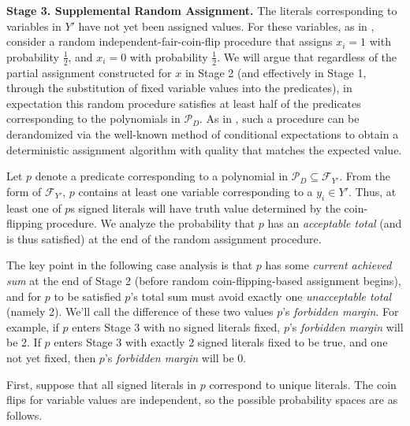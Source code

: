 \documentclass{article}
\begin{document}
\noindent \textbf{Stage 3. Supplemental Random Assignment.} The literals corresponding to variables in $Y'$ have not yet been assigned values. For these variables, as in \citep{RS}, consider a random independent-fair-coin-flip procedure that assigns $x_i=1$ with probability $\frac{1}{2}$, and $x_i=0$ with probability $\frac{1}{2}$. We will argue that regardless of the partial assignment constructed for $x$ in Stage 2 (and effectively in Stage 1, through the substitution of fixed variable values into the predicates), in expectation this random procedure satisfies at least half of the predicates corresponding to the polynomials in $\mathcal{P}_D$. As in \citep{RS}, such a procedure can be derandomized via the well-known method of conditional expectations to obtain a deterministic assignment algorithm with quality that matches the expected value.

Let $p$ denote a predicate corresponding to a polynomial in $\mathcal{P}_D\subseteq \mathcal{F}_{Y'}$. From the form of $\mathcal{F}_{Y'}$, $p$ contains at least one variable corresponding to a $y_i\in Y'$. Thus, at least one of $p$s signed literals will have truth value determined by the coin-flipping procedure. We analyze the probability that $p$ has an \textit{acceptable total} (and is thus satisfied) at the end of the random assignment procedure. 

The key point in the following case analysis is that $p$ has some \textit{current achieved sum} at the end of Stage 2 (before random coin-flipping-based assignment begins), and for $p$ to be satisfied $p$'s total sum must avoid exactly one \textit{unacceptable total} (namely 2). We'll call the difference of these two values $p$'s \textit{forbidden margin}. For example, if $p$ enters Stage 3 with no signed literals fixed, $p$'s \textit{forbidden margin} will be 2. If $p$ enters Stage 3 with exactly 2 signed literals fixed to be true, and one not yet fixed, then $p$'s \textit{forbidden margin} will be 0.  

First, suppose that all signed literals in $p$ correspond to unique literals. The coin flips for variable values are independent, so the possible probability spaces are as follows.\\
\end{document}
